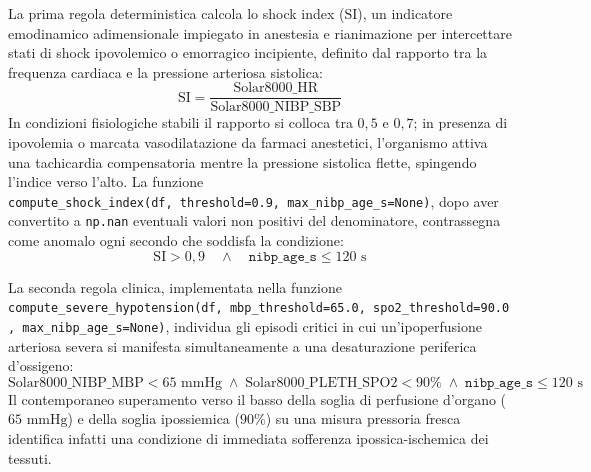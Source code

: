 La prima regola deterministica calcola lo shock index ($\text{SI}$), un indicatore emodinamico adimensionale impiegato in anestesia e rianimazione per intercettare stati di shock ipovolemico o emorragico incipiente, definito dal rapporto tra la frequenza cardiaca e la pressione arteriosa sistolica:
$$\text{SI} = \frac{\text{Solar8000\_HR}}{\text{Solar8000\_NIBP\_SBP}}$$
In condizioni fisiologiche stabili il rapporto si colloca tra $0,5$ e $0,7$; in presenza di ipovolemia o marcata vasodilatazione da farmaci anestetici, l'organismo attiva una tachicardia compensatoria mentre la pressione sistolica flette, spingendo l'indice verso l'alto. La funzione \texttt{compute\_\allowbreak shock\_\allowbreak index(df,\allowbreak\ threshold=0.9,\allowbreak\ max\_nibp\_age\_s=None)}, dopo aver convertito a \texttt{np.nan} eventuali valori non positivi del denominatore, contrassegna come anomalo ogni secondo che soddisfa la condizione:
$$\text{SI} > 0,9 \quad \land \quad \texttt{nibp\_age\_s} \le 120\text{ s}$$

La seconda regola clinica, implementata nella funzione \texttt{compute\_\allowbreak severe\_\allowbreak hypotension(df,\allowbreak\ mbp\_\allowbreak threshold=65.0,\allowbreak\ spo2\_\allowbreak threshold=90.0,\allowbreak\ max\_nibp\_age\_s=None)}, individua gli episodi critici in cui un'ipoperfusione arteriosa severa si manifesta simultaneamente a una desaturazione periferica d'ossigeno:
$$\text{Solar8000\_NIBP\_MBP} < 65\text{ mmHg} \;\land\; \text{Solar8000\_PLETH\_SPO2} < 90\% \;\land\; \texttt{nibp\_age\_s} \le 120\text{ s}$$
Il contemporaneo superamento verso il basso della soglia di perfusione d'organo ($65\text{ mmHg}$) e della soglia ipossiemica ($90\%$) su una misura pressoria fresca identifica infatti una condizione di immediata sofferenza ipossica-ischemica dei tessuti.

